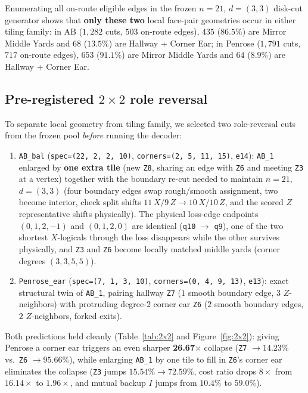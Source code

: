 \documentclass[11pt,a4paper]{article}
\begin{document}
Enumerating all on-route eligible edges in the frozen $n=21$, $d=(3,3)$ disk-cut generator shows that \textbf{only these two} local face-pair geometries occur in either tiling family: in AB ($1{,}282$ cuts, $503$ on-route edges), $435$ ($86.5\%$) are Mirror Middle Yards and $68$ ($13.5\%$) are Hallway + Corner Ear; in Penrose ($1{,}791$ cuts, $717$ on-route edges), $653$ ($91.1\%$) are Mirror Middle Yards and $64$ ($8.9\%$) are Hallway + Corner Ear.

\subsection{Pre-registered $2\times 2$ role reversal}
To separate local geometry from tiling family, we selected two role-reversal cuts from the frozen pool \emph{before} running the decoder:
\begin{enumerate}
    \item \texttt{AB\_bal} (\texttt{spec=(22, 2, 2, 10)}, \texttt{corners=(2, 5, 11, 15)}, \texttt{e14}): \texttt{AB\_1} enlarged by \textbf{one extra tile} (new \texttt{Z8}, sharing an edge with \texttt{Z6} and meeting \texttt{Z3} at a vertex) together with the boundary re-cut needed to maintain $n=21$, $d=(3,3)$ (four boundary edges swap rough/smooth assignment, two become interior, check split shifts $11\,X / 9\,Z \to 10\,X / 10\,Z$, and the scored $Z$ representative shifts physically). The physical loss-edge endpoints $(0,1,2,-1)$ and $(0,1,2,0)$ are identical (\texttt{q10} $\to$ \texttt{q9}), one of the two shortest $X$-logicals through the loss disappears while the other survives physically, and \texttt{Z3} and \texttt{Z6} become locally matched middle yards (corner degrees $(3,3,5,5)$).
    \item \texttt{Penrose\_ear} (\texttt{spec=(7, 1, 3, 10)}, \texttt{corners=(0, 4, 9, 13)}, \texttt{e13}): exact structural twin of \texttt{AB\_1}, pairing hallway \texttt{Z7} ($1$ smooth boundary edge, $3$ $Z$-neighbors) with protruding degree-2 corner ear \texttt{Z6} ($2$ smooth boundary edges, $2$ $Z$-neighbors, forked exits).
\end{enumerate}

Both predictions held cleanly (Table~\ref{tab:2x2} and Figure~\ref{fig:2x2}): giving Penrose a corner ear triggers an even sharper \textbf{26.67$\times$} collapse (\texttt{Z7} $\to 14.23\%$ vs.\ \texttt{Z6} $\to 95.66\%$), while enlarging \texttt{AB\_1} by one tile to fill in \texttt{Z6}'s corner ear eliminates the collapse (\texttt{Z3} jumps $15.54\% \to 72.59\%$, cost ratio drops $8\times$ from $16.14\times$ to $1.96\times$, and mutual backup $I$ jumps from $10.4\%$ to $59.0\%$).
\end{document}
